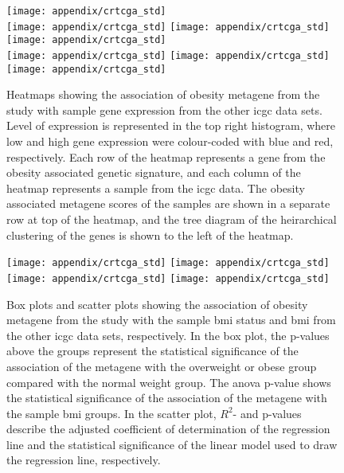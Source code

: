 \begin{appendices}
	\begin{figure}[htp!]
		\centering
		\texttt{[image: appendix/crtcga\_std]}\\
		\vspace{1em}
		\texttt{[image: appendix/crtcga\_std]}
		\texttt{[image: appendix/crtcga\_std]}
		\texttt{[image: appendix/crtcga\_std]}\\
		\vspace{1em}
		\texttt{[image: appendix/crtcga\_std]}
		\texttt{[image: appendix/crtcga\_std]}
		\texttt{[image: appendix/crtcga\_std]}\\
		\caption{Heatmaps showing the association of obesity metagene from the \citet{Creighton2012} study with sample gene expression from the other \gls{icgc} data sets.
	Level of expression is represented in the top right histogram, where low and high gene expression were colour-coded with blue and red, respectively.
	Each row of the heatmap represents a gene from the obesity associated genetic signature, and each column of the heatmap represents a sample from the \gls{icgc} data.
	The obesity associated metagene scores of the samples are shown in a separate row at top of the heatmap, and the tree diagram of the heirarchical clustering of the genes is shown to the left of the heatmap. }
		\label{fig:appendix/cr_icgc_heatmap}
	\end{figure}

	\begin{figure}[htpb]
		\centering
		\texttt{[image: appendix/crtcga\_std]}
		\hfill
		\texttt{[image: appendix/crtcga\_std]}\\
		\texttt{[image: appendix/crtcga\_std]}
		\hfill
		\texttt{[image: appendix/crtcga\_std]}\\
		\caption{Box plots and scatter plots showing the association of obesity metagene from the \citet{Creighton2012} study with the sample \gls{bmi} status  and \gls{bmi} from the other \gls{icgc} data sets, respectively.
	In the box plot, the p-values above the groups represent the statistical significance of the association of the metagene with the overweight or obese group compared with the normal weight group.
	The \gls{anova} p-value shows the statistical significance of the association of the metagene with the sample \gls{bmi} groups.
	In the scatter plot, $R^2$- and p-values describe the adjusted coefficient of determination of the regression line and the statistical significance of the linear model used to draw the regression line, respectively.}
		\label{fig:appendix/cr_icgc_box_scatter}
	\end{figure}


\end{appendices}
